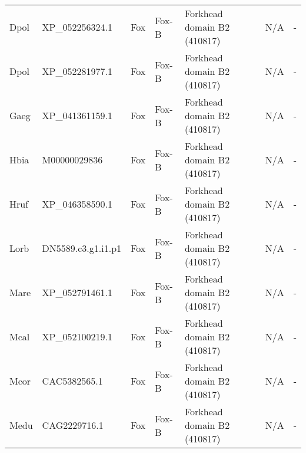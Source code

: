 \documentclass[../main.tex]{subfiles}
\begin{document}
\begin{landscape}
\begin{longtable}{lllllll}
		Dpol           & XP\_052256324.1       & Fox            & Fox-B               & Forkhead domain B2 (410817)                 & N/A                                                                    & -                    \\
		Dpol           & XP\_052281977.1       & Fox            & Fox-B               & Forkhead domain B2 (410817)                 & N/A                                                                    & -                    \\
		Gaeg           & XP\_041361159.1       & Fox            & Fox-B               & Forkhead domain B2 (410817)                 & N/A                                                                    & -                    \\
		Hbia           & M00000029836          & Fox            & Fox-B               & Forkhead domain B2 (410817)                 & N/A                                                                    & -                    \\
		Hruf           & XP\_046358590.1       & Fox            & Fox-B               & Forkhead domain B2 (410817)                 & N/A                                                                    & -                    \\
		Lorb           & DN5589.c3.g1.i1.p1    & Fox            & Fox-B               & Forkhead domain B2 (410817)                 & N/A                                                                    & -                    \\
		Mare           & XP\_052791461.1       & Fox            & Fox-B               & Forkhead domain B2 (410817)                 & N/A                                                                    & -                    \\
		Mcal           & XP\_052100219.1       & Fox            & Fox-B               & Forkhead domain B2 (410817)                 & N/A                                                                    & -                    \\
		Mcor           & CAC5382565.1          & Fox            & Fox-B               & Forkhead domain B2 (410817)                 & N/A                                                                    & -                    \\
		Medu           & CAG2229716.1          & Fox            & Fox-B               & Forkhead domain B2 (410817)                 & N/A                                                                    & -                    \\

\end{longtable}
\end{landscape}
\end{document}
